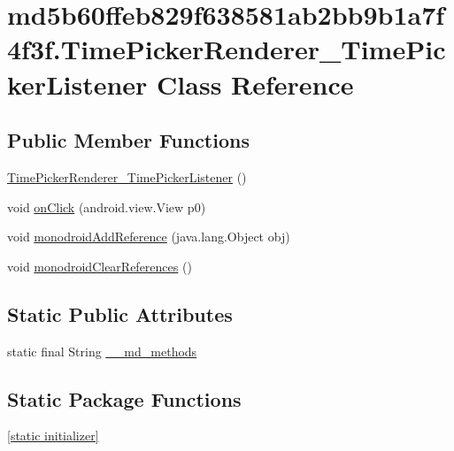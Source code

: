 \hypertarget{classmd5b60ffeb829f638581ab2bb9b1a7f4f3f_1_1_time_picker_renderer___time_picker_listener}{
\section{md5b60ffeb829f638581ab2bb9b1a7f4f3f.TimePickerRenderer\_\-TimePickerListener Class Reference}
\label{classmd5b60ffeb829f638581ab2bb9b1a7f4f3f_1_1_time_picker_renderer___time_picker_listener}
}
\subsection*{Public Member Functions}
\begin{CompactItemize}
\item 
\hyperlink{classmd5b60ffeb829f638581ab2bb9b1a7f4f3f_1_1_time_picker_renderer___time_picker_listener_7b31e1545073681e25d683cbd6fb5aa4}{TimePickerRenderer\_\-TimePickerListener} ()
\item 
void \hyperlink{classmd5b60ffeb829f638581ab2bb9b1a7f4f3f_1_1_time_picker_renderer___time_picker_listener_7c0e16ecc0f7f4dfae619b6a5d54735f}{onClick} (android.view.View p0)
\item 
void \hyperlink{classmd5b60ffeb829f638581ab2bb9b1a7f4f3f_1_1_time_picker_renderer___time_picker_listener_fe1bfc01f47c143b432ba0f7940fec7f}{monodroidAddReference} (java.lang.Object obj)
\item 
void \hyperlink{classmd5b60ffeb829f638581ab2bb9b1a7f4f3f_1_1_time_picker_renderer___time_picker_listener_f0690b3918502ce5234039a049d1a107}{monodroidClearReferences} ()
\end{CompactItemize}
\subsection*{Static Public Attributes}
\begin{CompactItemize}
\item 
static final String \hyperlink{classmd5b60ffeb829f638581ab2bb9b1a7f4f3f_1_1_time_picker_renderer___time_picker_listener_89be3c5d1a25817d66484c33310bfee7}{\_\-\_\-md\_\-methods}
\end{CompactItemize}
\subsection*{Static Package Functions}
\begin{CompactItemize}
\item 
\hyperlink{classmd5b60ffeb829f638581ab2bb9b1a7f4f3f_1_1_time_picker_renderer___time_picker_listener_074ff0941853baa51982fafdfef3884a}{\mbox{[}static initializer\mbox{]}}
\end{CompactItemize}

